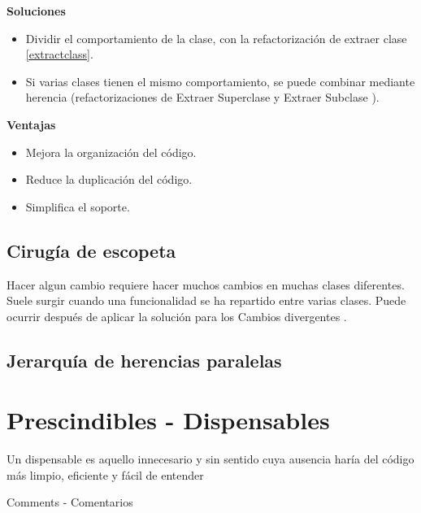 \documentclass[11pt,a4paper,oneside]{book}
\begin{document}
\textbf{Soluciones}
\begin{itemize}
    \item Dividir el comportamiento de la clase, con la refactorización de extraer clase \ref{extractclass}.
    \item Si varias clases tienen el mismo comportamiento, se puede combinar mediante herencia (refactorizaciones de Extraer Superclase \hyperef[extractsuperclass] y Extraer Subclase \hyperef[extractsubclass]).
\end{itemize}

\newline

\textbf{Ventajas}
\begin{itemize}
    \item Mejora la organización del código.
    \item Reduce la duplicación del código.
    \item Simplifica el soporte.
\end{itemize}

\subsection{Cirugía de escopeta}
Hacer algun cambio requiere hacer muchos cambios en muchas clases diferentes.
\newline
Suele surgir cuando una funcionalidad se ha repartido entre varias clases. Puede ocurrir después de aplicar la solución para los Cambios divergentes \hyperef[cambiosdivergentes].


\subsection{Jerarquía de herencias paralelas}



\section{Prescindibles - Dispensables}


Un dispensable es aquello innecesario y sin sentido cuya ausencia haría del código más limpio, eficiente y fácil de entender


    Comments - Comentarios
    
\end{document}
